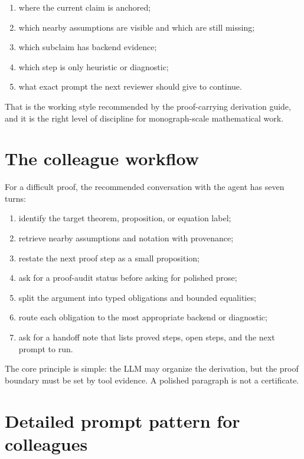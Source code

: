 \documentclass[12pt,a4paper,openany]{book}
\begin{document}
\begin{enumerate}[label=\arabic*.]
  \item where the current claim is anchored;
  \item which nearby assumptions are visible and which are still missing;
  \item which subclaim has backend evidence;
  \item which step is only heuristic or diagnostic;
  \item what exact prompt the next reviewer should give to continue.
\end{enumerate}

That is the working style recommended by the proof-carrying derivation guide, and
it is the right level of discipline for monograph-scale mathematical work.

\section*{The colleague workflow}

For a difficult proof, the recommended conversation with the agent has seven
turns:

\begin{enumerate}[label=\arabic*.]
  \item identify the target theorem, proposition, or equation label;
  \item retrieve nearby assumptions and notation with provenance;
  \item restate the next proof step as a small proposition;
  \item ask for a proof-audit status before asking for polished prose;
  \item split the argument into typed obligations and bounded equalities;
  \item route each obligation to the most appropriate backend or diagnostic;
  \item ask for a handoff note that lists proved steps, open steps, and the next
        prompt to run.
\end{enumerate}

The core principle is simple: the LLM may organize the derivation, but the proof
boundary must be set by tool evidence. A polished paragraph is not a
certificate.

\section*{Detailed prompt pattern for colleagues}
\end{document}
